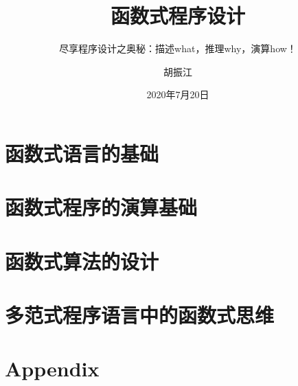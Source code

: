 \documentclass[cn,11pt]{elegantbook}
\title{函数式程序设计}
\subtitle{尽享程序设计之奥秘：描述what，推理why，演算how！}
\author{胡振江}
\institute{北京大学}
\date{2020年7月20日}
\begin{document}
\maketitle
\frontmatter

\tableofcontents

\mainmatter

\part{函数式语言的基础}









\part{函数式程序的演算基础}







\part{函数式算法的设计}





\part{多范式程序语言中的函数式思维}






\part{Appendix}





%
\nocite{*}
\printbibliography
\appendix
\end{document}
